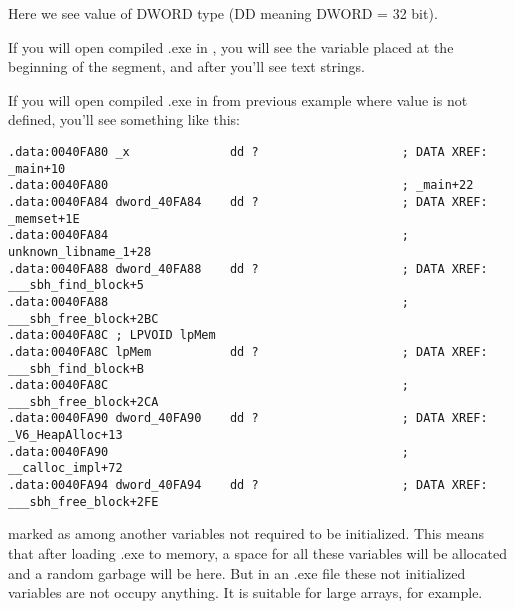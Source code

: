 {Here we see value  of DWORD type (DD meaning DWORD = 32 bit).}

{If you will open compiled .exe in \IDA, you will see the  variable placed at the beginning of 
the  segment, and after you'll see text strings.}

{If you will open compiled .exe in \IDA from previous example where  value is not defined, 
you'll see something like this:}

\begin{lstlisting}
.data:0040FA80 _x              dd ?                    ; DATA XREF: _main+10
.data:0040FA80                                         ; _main+22
.data:0040FA84 dword_40FA84    dd ?                    ; DATA XREF: _memset+1E
.data:0040FA84                                         ; unknown_libname_1+28
.data:0040FA88 dword_40FA88    dd ?                    ; DATA XREF: ___sbh_find_block+5
.data:0040FA88                                         ; ___sbh_free_block+2BC
.data:0040FA8C ; LPVOID lpMem
.data:0040FA8C lpMem           dd ?                    ; DATA XREF: ___sbh_find_block+B
.data:0040FA8C                                         ; ___sbh_free_block+2CA
.data:0040FA90 dword_40FA90    dd ?                    ; DATA XREF: _V6_HeapAlloc+13
.data:0040FA90                                         ; __calloc_impl+72
.data:0040FA94 dword_40FA94    dd ?                    ; DATA XREF: ___sbh_free_block+2FE
\end{lstlisting}

{ marked as  among another variables not required to be initialized. 
This means that after loading .exe to memory, a space for all these variables will be 
allocated and a random garbage will be here. 
But in an .exe file these not initialized variables are not occupy anything. 
It is suitable for large arrays, for example.}

